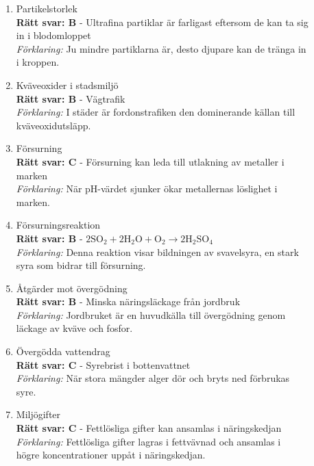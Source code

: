 \documentclass[a4paper]{article}
\begin{document}
\begin{enumerate}
\item Partikelstorlek\\
\textbf{Rätt svar: B} - Ultrafina partiklar är farligast eftersom de kan ta sig\\
in i blodomloppet\\
\textit{Förklaring:} Ju mindre partiklarna är, desto djupare kan de tränga in\\
i kroppen.

\item Kväveoxider i stadsmiljö\\
\textbf{Rätt svar: B} - Vägtrafik\\
\textit{Förklaring:} I städer är fordonstrafiken den dominerande källan till\\
kväveoxidutsläpp.

\item Försurning\\
\textbf{Rätt svar: C} - Försurning kan leda till utlakning av metaller i\\
marken\\
\textit{Förklaring:} När pH-värdet sjunker ökar metallernas löslighet i\\
marken.

\break

\item Försurningsreaktion\\
\textbf{Rätt svar: B} - $\mathrm{2SO_2 + 2H_2O + O_2 \rightarrow 2H_2SO_4}$\\
\textit{Förklaring:} Denna reaktion visar bildningen av svavelsyra, en stark\\
syra som bidrar till försurning.

\item Åtgärder mot övergödning\\
\textbf{Rätt svar: B} - Minska näringsläckage från jordbruk\\
\textit{Förklaring:} Jordbruket är en huvudkälla till övergödning genom\\
läckage av kväve och fosfor.

\item Övergödda vattendrag\\
\textbf{Rätt svar: C} - Syrebrist i bottenvattnet\\
\textit{Förklaring:} När stora mängder alger dör och bryts ned förbrukas\\
syre.

\item Miljögifter\\
\textbf{Rätt svar: C} - Fettlösliga gifter kan ansamlas i näringskedjan\\
\textit{Förklaring:} Fettlösliga gifter lagras i fettvävnad och ansamlas i\\
högre koncentrationer uppåt i näringskedjan.


\end{enumerate}
\end{document}
